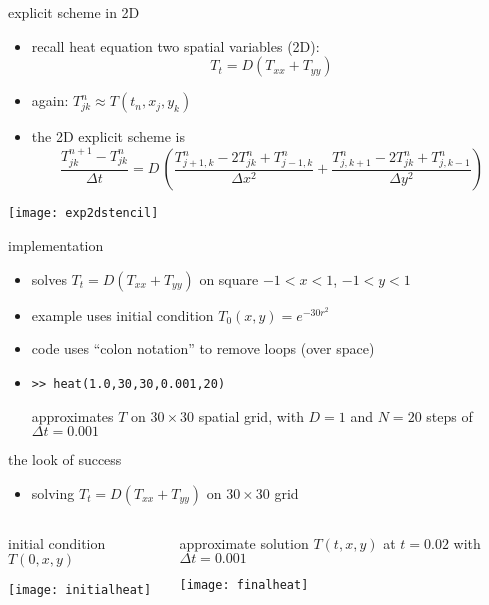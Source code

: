 \begin{frame}{explicit scheme in 2D}

\begin{itemize}
\item recall heat equation two spatial variables (2D):
    $$T_t = D(T_{xx} + T_{yy})$$
\item again: $T_{jk}^n \approx T(t_n,x_j,y_k)$
\item the 2D explicit scheme is
\small
	$$\frac{T_{jk}^{n+1} - T_{jk}^n}{\Delta t} = D\,\left(\frac{T_{j+1,k}^n - 2 T_{jk}^n + T_{j-1,k}^n}{\Delta x^2} + \frac{T_{j,k+1}^n - 2 T_{jk}^n + T_{j,k-1}^n}{\Delta y^2}\right)$$
\end{itemize}

\bigskip
\begin{center}
\texttt{[image: exp2dstencil]}
\end{center}
\end{frame}


\begin{frame}{implementation}
\label{slide:heatmatlab}


\small
\begin{itemize}
\item solves $T_t = D(T_{xx} + T_{yy})$ on square $-1 < x < 1$, $-1 < y < 1$
\item example uses initial condition $T_0(x,y) = e^{-30 r^2}$
\item code uses ``colon notation'' to remove loops (over space)
\item \texttt{>>  heat(1.0,30,30,0.001,20)}

approximates $T$ on $30\times 30$ spatial grid, with $D=1$ and $N=20$ steps of $\Delta t = 0.001$
\end{itemize}
\end{frame}


\begin{frame}{the look of success}

\begin{itemize}
\item solving $T_t = D(T_{xx} + T_{yy})$ on $30\times 30$ grid
\end{itemize}

\bigskip\bigskip
\begin{columns}
\begin{column}{0.5\textwidth}
initial condition $T(0,x,y)$

\bigskip
\begin{center}
\texttt{[image: initialheat]}
\end{center}
\end{column}
\begin{column}{0.5\textwidth}
approximate solution $T(t,x,y)$ at $t=0.02$ with $\Delta t=0.001$ 

\bigskip
\begin{center}
\texttt{[image: finalheat]}
\end{center}
\end{column}
\end{columns}
\end{frame}


